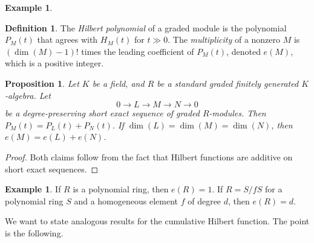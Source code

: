 \documentclass{amsart}[12pt]
\numberwithin{equation}{section}
\theoremstyle{plain} %
\newtheorem{proposition}[equation]{Proposition}
\theoremstyle{definition}
\newtheorem{definition}[equation]{Definition}
\newtheorem{ex}[equation]{Example}
\newtheorem{example}[equation]{Example}
\theoremstyle{remark}
\begin{document}
\begin{ex}
\begin{definition}
	The \emph{Hilbert polynomial} of a graded module is the polynomial $P_M(t)$ that agrees with $H_M(t)$ for $t\gg 0$. The \emph{multiplicity} of a nonzero $M$ is $(\dim(M)-1)!$ times the leading coefficient of $P_M(t)$, denoted $e(M)$, which is a positive integer.
\end{definition}




\begin{proposition}
	Let $K$ be a field, and $R$ be a standard graded finitely generated $K$-algebra. Let \[0\to L \to M \to N \to 0\] be a degree-preserving short exact sequence of graded $R$-modules. Then $P_M(t)=P_L(t)+P_N(t)$. If $\dim(L)=\dim(M)=\dim(N)$, then $e(M)=e(L)+e(N)$.
\end{proposition}
\begin{proof}
	Both claims follow from the fact that Hilbert functions are additive on short exact sequences.
\end{proof}

\begin{example}
	If $R$ is a polynomial ring, then $e(R)=1$. If $R=S/fS$ for a polynomial ring $S$ and a homogeneous element $f$ of degree $d$, then $e(R)=d$.\end{example}

We want to state analogous results for the cumulative Hilbert function. The point is the following.


\end{ex}
\end{document}

